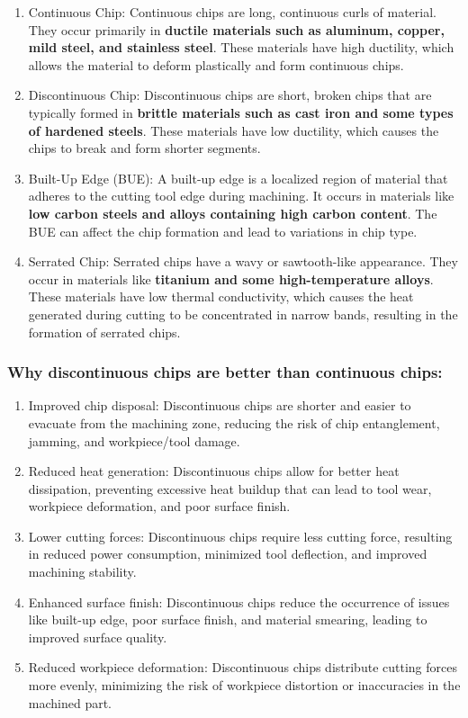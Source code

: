 \documentclass{article}
\begin{document}
\begin{enumerate}
  \item Continuous Chip: Continuous chips are long, continuous curls of material. They occur primarily in \textbf{ductile materials such as aluminum, copper, mild steel, and stainless steel}. These materials have high ductility, which allows the material to deform plastically and form continuous chips.
  \item Discontinuous Chip: Discontinuous chips are short, broken chips that are typically formed in \textbf{brittle materials such as cast iron and some types of hardened steels}. These materials have low ductility, which causes the chips to break and form shorter segments.
  \item Built-Up Edge (BUE): A built-up edge is a localized region of material that adheres to the cutting tool edge during machining. It occurs in materials like \textbf{low carbon steels and alloys containing high carbon content}. The BUE can affect the chip formation and lead to variations in chip type.
  \item Serrated Chip: Serrated chips have a wavy or sawtooth-like appearance. They occur in materials like\textbf{ titanium and some high-temperature alloys}. These materials have low thermal conductivity, which causes the heat generated during cutting to be concentrated in narrow bands, resulting in the formation of serrated chips.
\end{enumerate}

\subsubsection*{Why discontinuous chips are better than continuous chips:}
\begin{enumerate}
  \item Improved chip disposal: Discontinuous chips are shorter and easier to evacuate from the machining zone, reducing the risk of chip entanglement, jamming, and workpiece/tool damage.
  \item Reduced heat generation: Discontinuous chips allow for better heat dissipation, preventing excessive heat buildup that can lead to tool wear, workpiece deformation, and poor surface finish.
  \item Lower cutting forces: Discontinuous chips require less cutting force, resulting in reduced power consumption, minimized tool deflection, and improved machining stability.
  \item Enhanced surface finish: Discontinuous chips reduce the occurrence of issues like built-up edge, poor surface finish, and material smearing, leading to improved surface quality.
  \item Reduced workpiece deformation: Discontinuous chips distribute cutting forces more evenly, minimizing the risk of workpiece distortion or inaccuracies in the machined part.
\end{enumerate}
\end{document}
